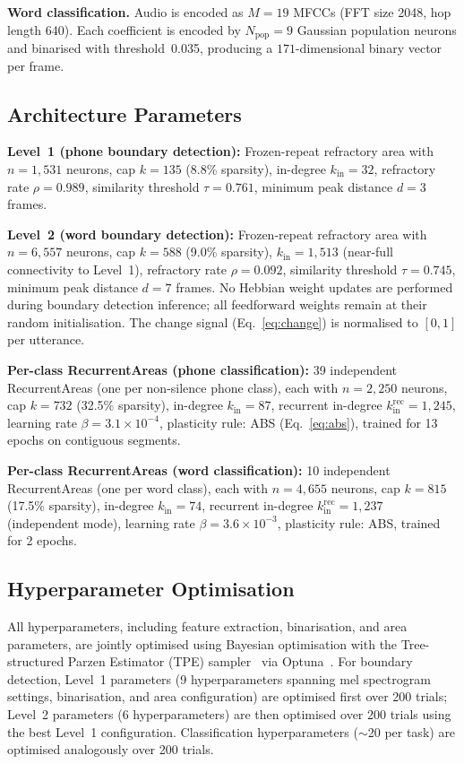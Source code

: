 \noindent \textbf{Word classification.} Audio is encoded as $M{=}19$ MFCCs (FFT size 2048, hop length 640). Each coefficient is encoded by $N_\mathrm{pop}{=}9$ Gaussian population neurons and binarised with threshold~0.035, producing a $171$-dimensional binary vector per frame.

\subsection{Architecture Parameters}

\textbf{Level~1 (phone boundary detection):} Frozen-repeat refractory area with $n{=}1{,}531$ neurons, cap $k{=}135$ (8.8\% sparsity), in-degree $k_\mathrm{in}{=}32$, refractory rate $\rho{=}0.989$, similarity threshold $\tau{=}0.761$, minimum peak distance $d{=}3$ frames.

\noindent\textbf{Level~2 (word boundary detection):} Frozen-repeat refractory area with $n{=}6{,}557$ neurons, cap $k{=}588$ (9.0\% sparsity), $k_\mathrm{in}{=}1{,}513$ (near-full connectivity to Level~1), refractory rate $\rho{=}0.092$, similarity threshold $\tau{=}0.745$, minimum peak distance $d{=}7$ frames. 
No Hebbian weight updates are performed during boundary detection inference; all feedforward weights remain at their random initialisation. The change signal (Eq.~\ref{eq:change}) is normalised to $[0,1]$ per utterance.

\noindent\textbf{Per-class RecurrentAreas (phone classification):} 39 independent RecurrentAreas (one per non-silence phone class), each with $n{=}2{,}250$ neurons, cap $k{=}732$ (32.5\% sparsity), in-degree $k_\mathrm{in}{=}87$, recurrent in-degree $k_\mathrm{in}^\mathrm{rec}{=}1{,}245$, learning rate $\beta{=}3.1{\times}10^{-4}$, plasticity rule: ABS (Eq.~\ref{eq:abs}), trained for 13 epochs on contiguous segments.

\noindent\textbf{Per-class RecurrentAreas (word classification):} 10 independent RecurrentAreas (one per word class), each with $n{=}4{,}655$ neurons, cap $k{=}815$ (17.5\% sparsity), in-degree $k_\mathrm{in}{=}74$, recurrent in-degree $k_\mathrm{in}^\mathrm{rec}{=}1{,}237$ (independent mode), learning rate $\beta{=}3.6{\times}10^{-3}$, plasticity rule: ABS, trained for 2 epochs.

\subsection{Hyperparameter Optimisation}
\label{sec:tuning}

All hyperparameters, including feature extraction, binarisation, and area parameters, are jointly optimised using Bayesian optimisation with the Tree-structured Parzen Estimator (TPE) sampler~\cite{Bergstra11} via Optuna~\cite{Akiba19}. For boundary detection, Level~1 parameters (9 hyperparameters spanning mel spectrogram settings, binarisation, and area configuration) are optimised first over 200 trials; Level~2 parameters (6 hyperparameters) are then optimised over 200 trials using the best Level~1 configuration. Classification hyperparameters (${\sim}$20 per task) are optimised analogously over 200 trials.

